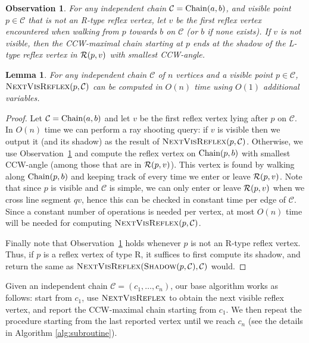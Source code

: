 \documentclass[a4paper]{article}
\newtheorem{lemma}{Lemma}
\newtheorem{observation}{Observation}
\newcommand{\C}{\ensuremath{{\mathcal C}}}
\begin{document}
\begin{observation}\label{obs:SmallestAngle}
For any independent chain $\mathcal{C}={\mathrm{Chain}}(a,b)$, and visible point $p\in \C$ that is not an R-type reflex vertex, let $v$ be the first reflex vertex encountered when walking from $p$ towards $b$ on $\C$ (or $b$ if none exists). If $v$ is not visible, then the CCW-maximal chain starting at $p$ ends at the shadow of the L-type reflex vertex in ${{\mathcal R}}(p,v)$ with smallest CCW-angle.
\end{observation}

\begin{lemma}\label{lem_next}
For any independent chain $\C$ of $n$ vertices and a visible point $p\in \C$, \linebreak$\textsc{NextVisReflex}(p,\C)$ can be computed in $O(n)$ time using $O(1)$ additional variables.
\end{lemma}
\begin{proof}
Let $\mathcal{C}={\mathrm{Chain}}(a,b)$ and let $v$ be the first reflex vertex lying after $p$ on $\C$.
In $O(n)$ time we can perform a ray shooting query: if $v$ is visible then we output it (and its shadow) as the result of $\textsc{NextVisReflex}(p,\C)$. Otherwise, we use Observation~\ref{obs:SmallestAngle} and compute the reflex vertex on ${\mathrm{Chain}}(p,b)$ with smallest CCW-angle (among those that are in ${{\mathcal R}}(p,v)$). This vertex is found by walking along ${\mathrm{Chain}}(p,b)$ and keeping track of every time we enter or leave ${{\mathcal R}}(p,v)$. Note that since $p$ is visible and $\C$ is simple, we can only enter or leave ${{\mathcal R}}(p,v)$ when we cross line segment $qv$, hence this can be checked in constant time per edge of \C. Since a constant number of operations is needed per vertex, at most $O(n)$ time will be needed for computing $\textsc{NextVisReflex}(p,\C)$. 

Finally note that Observation~\ref{obs:SmallestAngle}  holds whenever $p$ is not an R-type reflex vertex. Thus, if $p$ is a reflex vertex of type R, it suffices to first compute its shadow, and  return the same as  $\textsc{NextVisReflex}(\textsc{Shadow}(p,\C),\C)$ would.
\end{proof}


Given an  independent chain $\C = (c_1, \ldots, c_n )$, our base algorithm works as follows: start from $c_1$, use $\textsc{NextVisReflex}$ to obtain the next visible reflex vertex, and report the CCW-maximal chain starting from $c_1$. We then repeat the procedure starting from the last reported vertex until we reach $c_n$ (see the details in Algorithm \ref{alg:subroutine}). 
\end{document}
